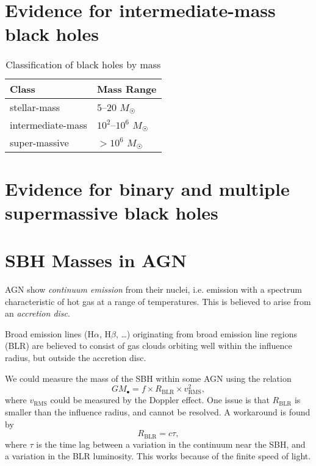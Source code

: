 \documentclass[degn-notes.tex]{subfiles}
\begin{document}
\section{Evidence for intermediate-mass black holes}

\begin{table}[h]
  \centering
  \begin{tabular}{l|l}
    \textbf{Class}    & \textbf{Mass Range}
    \\ \hline\hline
    stellar-mass      & $5$--$20$ $M_\Sun$
    \\
    intermediate-mass & $10^2$--$10^6$ $M_\Sun$
    \\
    super-massive     & $>10^6$ $M_\Sun$
  \end{tabular}
  \caption{Classification of black holes by mass}
\end{table}


\section{Evidence for binary and multiple supermassive black holes}


\section*{SBH Masses in AGN}

AGN show \emph{continuum emission} from their nuclei, i.e. emission with a spectrum characteristic of hot gas at a range of temperatures. This is believed to arise from an \emph{accretion disc}.

Broad emission lines (H$\alpha$, H$\beta$, \ldots) originating from broad emission line regions (BLR) are believed to consist of gas clouds orbiting well within the influence radius, but outside the accretion disc.

We could measure the mass of the SBH within some AGN using the relation
%
\begin{equation}
  G M_\bullet = f \times R_{\mathrm{BLR}} \times v_{\mathrm{RMS}}^2,
%
  \label{eqn:agn-mass}
\end{equation}
%
where $v_{\mathrm{RMS}}$ could be measured by the Doppler effect. One issue is that $R_{\mathrm{BLR}}$ is smaller than the influence radius, and cannot be resolved. A workaround is found by
%
\begin{equation}
  R_{\mathrm{BLR}} = c \tau,
%
  \label{eqn:blr-radius}
\end{equation}
%
where $\tau$ is the time lag between a variation in the continuum near the SBH, and a variation in the BLR luminosity. This works because of the finite speed of light.
\end{document}
